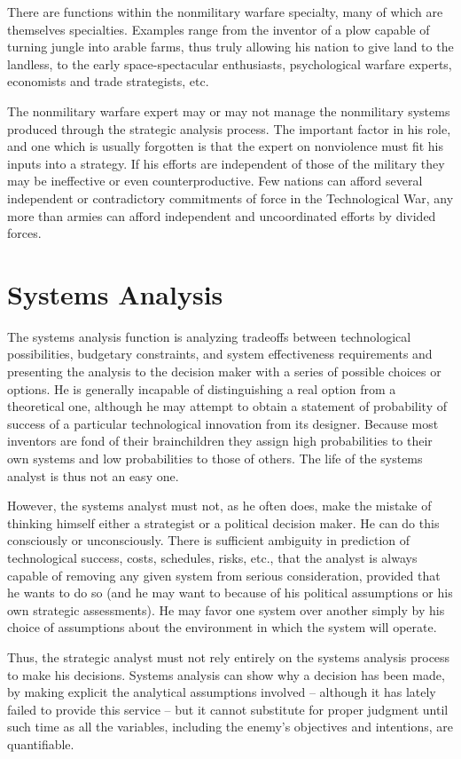 There are functions within the nonmilitary warfare specialty, many of which are themselves specialties. Examples range from the inventor of a plow capable of turning jungle into arable farms, thus truly allowing his nation to give land to the landless, to the early space-spectacular enthusiasts, psychological warfare experts, economists and trade strategists, etc.

The nonmilitary warfare expert may or may not manage the nonmilitary systems produced through the strategic analysis process. The important factor in his role, and one which is usually forgotten is that the expert on nonviolence must fit his inputs into a strategy. If his efforts are independent of those of the military they may be ineffective or even counterproductive. Few nations can afford several independent or contradictory commitments of force in the Technological War, any more than armies can afford independent and uncoordinated efforts by divided forces.

\section{Systems Analysis}
The systems analysis function is analyzing tradeoffs between technological possibilities, budgetary constraints, and system effectiveness requirements and presenting the analysis to the decision maker with a series of possible choices or options. He is generally incapable of distinguishing a real option from a theoretical one, although he may attempt to obtain a statement of probability of success of a particular technological innovation from its designer. Because most inventors are fond of their brainchildren they assign high probabilities to their own systems and low probabilities to those of others. The life of the systems analyst is thus not an easy one.

However, the systems analyst must not, as he often does, make the mistake of thinking himself either a strategist or a political decision maker. He can do this consciously or unconsciously. There is sufficient ambiguity in prediction of technological success, costs, schedules, risks, etc., that the analyst is always capable of removing any given system from serious consideration, provided that he wants to do so (and he may want to because of his political assumptions or his own strategic assessments). He may favor one system over another simply by his choice of assumptions about the environment in which the system will operate.

Thus, the strategic analyst must not rely entirely on the systems analysis process to make his decisions. Systems analysis can show why a decision has been made, by making explicit the analytical assumptions involved -- although it has lately failed to provide this service -- but it cannot substitute for proper judgment until such time as all the variables, including the enemy's objectives and intentions, are quantifiable.

